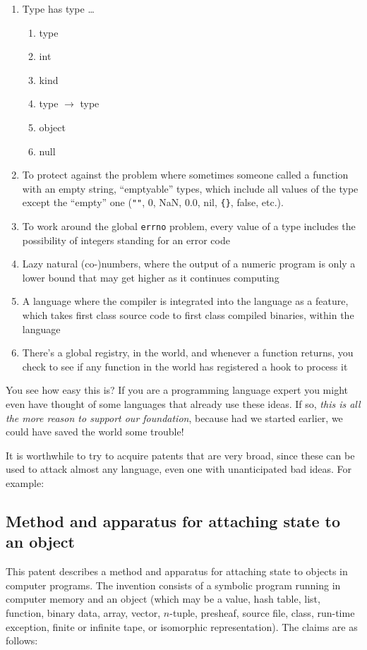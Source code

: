 \documentclass[acmtocl]%
{boviktrans}
\begin{document}
\begin{enumerate}
\item Type has type \ldots
  \begin{enumerate}
    \item type
    \item int
    \item kind
    \item type $\rightarrow$ type
    \item object
    \item null
  \end{enumerate}
\item To protect against the problem where sometimes someone called a function with an empty string, ``emptyable'' types, which include all values of the type except the ``empty'' one (\verb+""+, 0, NaN, 0.0, nil, \verb+{}+, false, etc.).
\item To work around the global {\tt errno} problem, every value of a type includes the possibility of integers standing for an error code
\item Lazy natural (co-)numbers, where the output of a numeric program is only a lower bound that may get higher as it continues computing
\item A language where the compiler is integrated into the language as a feature, which takes first class source code to first class compiled binaries, within the language
\item There's a global registry, in the world, and whenever a function returns, you check to see if any function in the world has registered a hook to process it
\end{enumerate}

You see how easy this is? If you are a programming language expert you
might even have thought of some languages that already use these
ideas. If so, {\it this is all the more reason to support our
  foundation}, because had we started earlier, we could have saved the
world some trouble!

It is worthwhile to try to acquire patents that are very broad, since
these can be used to attack almost any language, even one with
unanticipated bad ideas. For example:


\subsection{Method and apparatus for attaching state to an object}

This patent describes a method and apparatus for attaching state to
objects in computer programs. The invention consists of a symbolic
program running in computer memory and an object (which may be a value,
hash table, list, function, binary data, array, vector, $n$-tuple,
presheaf, source file, class, run-time exception, finite or infinite
tape, or isomorphic representation). The claims are as follows:
\end{document}
